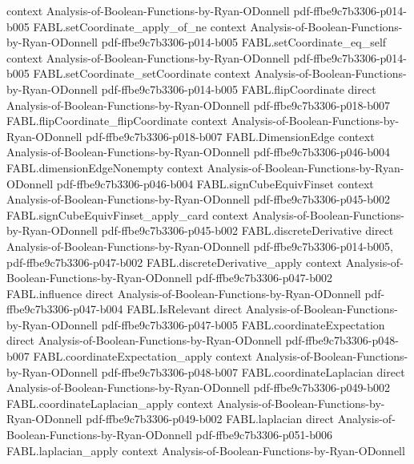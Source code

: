 \begin{theorem}
  {context}
  {Analysis-of-Boolean-Functions-by-Ryan-ODonnell}
  {pdf-ffbe9c7b3306-p014-b005}
\proofstep
  {FABL.setCoordinate_apply_of_ne}
  {context}
  {Analysis-of-Boolean-Functions-by-Ryan-ODonnell}
  {pdf-ffbe9c7b3306-p014-b005}
\proofstep
  {FABL.setCoordinate_eq_self}
  {context}
  {Analysis-of-Boolean-Functions-by-Ryan-ODonnell}
  {pdf-ffbe9c7b3306-p014-b005}
\proofstep
  {FABL.setCoordinate_setCoordinate}
  {context}
  {Analysis-of-Boolean-Functions-by-Ryan-ODonnell}
  {pdf-ffbe9c7b3306-p014-b005}
\proofstep
  {FABL.flipCoordinate}
  {direct}
  {Analysis-of-Boolean-Functions-by-Ryan-ODonnell}
  {pdf-ffbe9c7b3306-p018-b007}
\proofstep
  {FABL.flipCoordinate_flipCoordinate}
  {context}
  {Analysis-of-Boolean-Functions-by-Ryan-ODonnell}
  {pdf-ffbe9c7b3306-p018-b007}
\proofstep
  {FABL.DimensionEdge}
  {context}
  {Analysis-of-Boolean-Functions-by-Ryan-ODonnell}
  {pdf-ffbe9c7b3306-p046-b004}
\proofstep
  {FABL.dimensionEdgeNonempty}
  {context}
  {Analysis-of-Boolean-Functions-by-Ryan-ODonnell}
  {pdf-ffbe9c7b3306-p046-b004}
\proofstep
  {FABL.signCubeEquivFinset}
  {context}
  {Analysis-of-Boolean-Functions-by-Ryan-ODonnell}
  {pdf-ffbe9c7b3306-p045-b002}
\proofstep
  {FABL.signCubeEquivFinset_apply_card}
  {context}
  {Analysis-of-Boolean-Functions-by-Ryan-ODonnell}
  {pdf-ffbe9c7b3306-p045-b002}
\proofstep
  {FABL.discreteDerivative}
  {direct}
  {Analysis-of-Boolean-Functions-by-Ryan-ODonnell}
  {pdf-ffbe9c7b3306-p014-b005,
    pdf-ffbe9c7b3306-p047-b002}
\proofstep
  {FABL.discreteDerivative_apply}
  {context}
  {Analysis-of-Boolean-Functions-by-Ryan-ODonnell}
  {pdf-ffbe9c7b3306-p047-b002}
\proofstep
  {FABL.influence}
  {direct}
  {Analysis-of-Boolean-Functions-by-Ryan-ODonnell}
  {pdf-ffbe9c7b3306-p047-b004}
\proofstep
  {FABL.IsRelevant}
  {direct}
  {Analysis-of-Boolean-Functions-by-Ryan-ODonnell}
  {pdf-ffbe9c7b3306-p047-b005}
\proofstep
  {FABL.coordinateExpectation}
  {direct}
  {Analysis-of-Boolean-Functions-by-Ryan-ODonnell}
  {pdf-ffbe9c7b3306-p048-b007}
\proofstep
  {FABL.coordinateExpectation_apply}
  {context}
  {Analysis-of-Boolean-Functions-by-Ryan-ODonnell}
  {pdf-ffbe9c7b3306-p048-b007}
\proofstep
  {FABL.coordinateLaplacian}
  {direct}
  {Analysis-of-Boolean-Functions-by-Ryan-ODonnell}
  {pdf-ffbe9c7b3306-p049-b002}
\proofstep
  {FABL.coordinateLaplacian_apply}
  {context}
  {Analysis-of-Boolean-Functions-by-Ryan-ODonnell}
  {pdf-ffbe9c7b3306-p049-b002}
\proofstep
  {FABL.laplacian}
  {direct}
  {Analysis-of-Boolean-Functions-by-Ryan-ODonnell}
  {pdf-ffbe9c7b3306-p051-b006}
\proofstep
  {FABL.laplacian_apply}
  {context}
  {Analysis-of-Boolean-Functions-by-Ryan-ODonnell}

\end{theorem}
